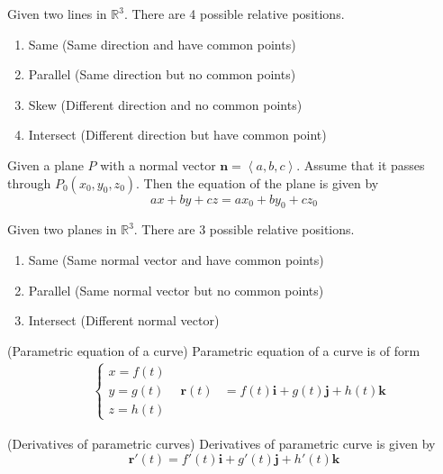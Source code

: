 \documentclass{huhtakm-template-book}
\begin{document}
\begin{thm}
    Given two lines in $\mathbb{R}^{3}$. There are 4 possible relative positions.
    \begin{enumerate}
        \item Same (Same direction and have common points)
        \item Parallel (Same direction but no common points)
        \item Skew (Different direction and no common points)
        \item Intersect (Different direction but have common point)
    \end{enumerate}
\end{thm}
\begin{defn}
    Given a plane $P$ with a normal vector $\mathbf{n}=\left<a,b,c\right>$. Assume that it passes through $P_{0}(x_{0},y_{0},z_{0})$. Then the equation of the plane is given by
    \begin{equation*}
        ax+by+cz=ax_{0}+by_{0}+cz_{0}
    \end{equation*}
\end{defn}
\begin{thm}
    Given two planes in $\mathbb{R}^{3}$. There are 3 possible relative positions.
    \begin{enumerate}
        \item Same (Same normal vector and have common points)
        \item Parallel (Same normal vector but no common points)
        \item Intersect (Different normal vector)
    \end{enumerate}
\end{thm}
\begin{defn}(Parametric equation of a curve)
    Parametric equation of a curve is of form
    \begin{align*}
        &\begin{cases}
            x=f(t)\\
            y=g(t)\\
            z=h(t)
        \end{cases} & \mathbf{r}(t)&=f(t)\mathbf{i}+g(t)\mathbf{j}+h(t)\mathbf{k}
    \end{align*}
\end{defn}
\begin{defn}(Derivatives of parametric curves)
    Derivatives of parametric curve is given by
    \begin{equation*}
        \mathbf{r}'(t)=f'(t)\mathbf{i}+g'(t)\mathbf{j}+h'(t)\mathbf{k}
    \end{equation*}
\end{defn}
\end{document}
